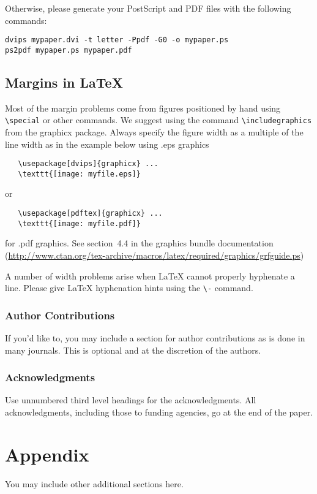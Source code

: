 \documentclass{article} %
\begin{document}
Otherwise, please generate your PostScript and PDF files with the following commands:
\begin{verbatim}
dvips mypaper.dvi -t letter -Ppdf -G0 -o mypaper.ps
ps2pdf mypaper.ps mypaper.pdf
\end{verbatim}

\subsection{Margins in LaTeX}

Most of the margin problems come from figures positioned by hand using
\verb+\special+ or other commands. We suggest using the command
\verb+\includegraphics+
from the graphicx package. Always specify the figure width as a multiple of
the line width as in the example below using .eps graphics
\begin{verbatim}
   \usepackage[dvips]{graphicx} ...
   \texttt{[image: myfile.eps]}
\end{verbatim}
or %
\begin{verbatim}
   \usepackage[pdftex]{graphicx} ...
   \texttt{[image: myfile.pdf]}
\end{verbatim}
for .pdf graphics.
See section~4.4 in the graphics bundle documentation (\url{http://www.ctan.org/tex-archive/macros/latex/required/graphics/grfguide.ps})

A number of width problems arise when LaTeX cannot properly hyphenate a
line. Please give LaTeX hyphenation hints using the \verb+\-+ command.

\subsubsection*{Author Contributions}
If you'd like to, you may include  a section for author contributions as is done
in many journals. This is optional and at the discretion of the authors.

\subsubsection*{Acknowledgments}
Use unnumbered third level headings for the acknowledgments. All
acknowledgments, including those to funding agencies, go at the end of the paper.





\appendix
\section{Appendix}
You may include other additional sections here.
\end{document}
